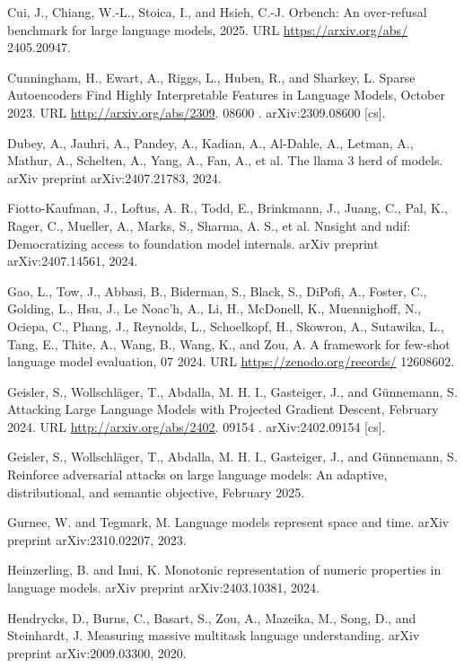 \documentclass[10pt]{article}
\begin{document}
Cui, J., Chiang, W.-L., Stoica, I., and Hsieh, C.-J. Orbench: An over-refusal benchmark for large language models, 2025. URL \href{https://arxiv.org/abs/}{https://arxiv.org/abs/} 2405.20947.

Cunningham, H., Ewart, A., Riggs, L., Huben, R., and Sharkey, L. Sparse Autoencoders Find Highly Interpretable Features in Language Models, October 2023. URL \href{http://arxiv.org/abs/2309}{http://arxiv.org/abs/2309}. 08600 . arXiv:2309.08600 [cs].

Dubey, A., Jauhri, A., Pandey, A., Kadian, A., Al-Dahle, A., Letman, A., Mathur, A., Schelten, A., Yang, A., Fan, A., et al. The llama 3 herd of models. arXiv preprint arXiv:2407.21783, 2024.

Fiotto-Kaufman, J., Loftus, A. R., Todd, E., Brinkmann, J., Juang, C., Pal, K., Rager, C., Mueller, A., Marks, S., Sharma, A. S., et al. Nnsight and ndif: Democratizing access to foundation model internals. arXiv preprint arXiv:2407.14561, 2024.

Gao, L., Tow, J., Abbasi, B., Biderman, S., Black, S., DiPofi, A., Foster, C., Golding, L., Hsu, J., Le Noac'h, A., Li, H., McDonell, K., Muennighoff, N., Ociepa, C., Phang, J., Reynolds, L., Schoelkopf, H., Skowron, A., Sutawika, L., Tang, E., Thite, A., Wang, B., Wang, K., and Zou, A. A framework for few-shot language model evaluation, 07 2024. URL \href{https://zenodo.org/records/}{https://zenodo.org/records/} 12608602.

Geisler, S., Wollschläger, T., Abdalla, M. H. I., Gasteiger, J., and Günnemann, S. Attacking Large Language Models with Projected Gradient Descent, February 2024. URL \href{http://arxiv.org/abs/2402}{http://arxiv.org/abs/2402}. 09154 . arXiv:2402.09154 [cs].

Geisler, S., Wollschläger, T., Abdalla, M. H. I., Gasteiger, J., and Günnemann, S. Reinforce adversarial attacks on large language models: An adaptive, distributional, and semantic objective, February 2025.

Gurnee, W. and Tegmark, M. Language models represent space and time. arXiv preprint arXiv:2310.02207, 2023.

Heinzerling, B. and Inui, K. Monotonic representation of numeric properties in language models. arXiv preprint arXiv:2403.10381, 2024.

Hendrycks, D., Burns, C., Basart, S., Zou, A., Mazeika, M., Song, D., and Steinhardt, J. Measuring massive multitask language understanding. arXiv preprint arXiv:2009.03300, 2020.
\end{document}
